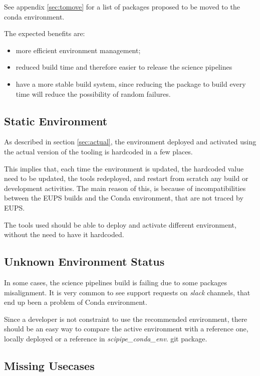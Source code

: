 See appendix \ref{sec:tomove} for a list of packages proposed to be moved to the conda environment.

The expected benefits are:

\begin{itemize}
\item more efficient environment management;
\item reduced build time and therefore easier to release the science pipelines
\item have a more stable build system, since reducing the package to build every time will reduce the possibility of random failures.
\end{itemize}


\subsection{Static Environment} \label{sec:static}

As described in section \ref{sec:actual}, the environment deployed and activated using the actual version of the tooling is hardcoded in a few places.

This implies that, each time the environment is updated, the hardcoded value need to be updated, the tools redeployed, and restart from scratch any build or development activities.
The main reason of this, is because of incompatibilities between the EUPS builds and the Conda environment, that are not traced by EUPS.

The tools used should be able to deploy and activate different environment, without the need to have it hardcoded.


\subsection{Unknown Environment Status} \label{sec:unknown}

In some cases, the science pipelines build is failing due to some packages misalignment. 
It is very common to see support requests on \textit{slack} channels, that end up been a problem of Conda environment.

Since a developer is not constraint to use the recommended environment, there should be an easy way to compare the active environment  with a reference one, locally deployed or a reference in \textit{scipipe\_conda\_env}. git package.


\subsection{Missing Usecases}

